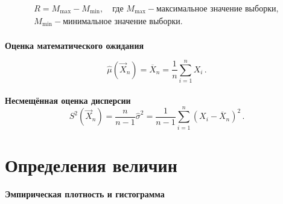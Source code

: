 \begin{eqnarray}
R = M_{\max} - M_{\min}, \quad \text{где } M_{\max} - \text{максимальное значение выборки}, \\ M_{\min} - \text{минимальное значение выборки}.
\end{eqnarray}
\\ \textbf{Оценка математического ожидания}

\begin{equation}
\hat{\mu}(\vec{X}_n) = \overline{X}_n = \frac{1}{n} \sum_{i = 1}^{n} X_i\,.
\end{equation}
\\
\textbf{Несмещённая оценка дисперсии}
\begin{equation}
S^2(\vec{X}_n) = \frac{n}{n - 1}\hat{\sigma}^2 = \frac{1}{n - 1}\sum_{i = 1}^{n} (X_i - \overline{X}_n)^2\,.
\end{equation}

\section*{Определения величин}

\textbf{Эмпирическая плотность и гистограмма}

